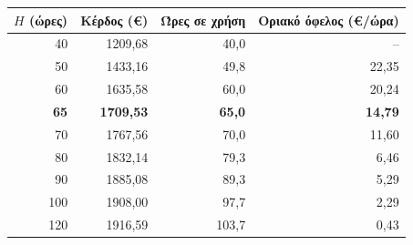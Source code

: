 \begin{tabular}{@{}rrrr@{}}
\toprule
$H$ (ώρες) & \textbf{Κέρδος (€)} & \textbf{Ώρες σε χρήση} & \textbf{Οριακό όφελος (€/ώρα)} \\
\midrule
40 & 1209,68 & 40,0 & -- \\
50 & 1433,16 & 49,8 & 22,35 \\
60 & 1635,58 & 60,0 & 20,24 \\
\bfseries 65 & \bfseries 1709,53 & \bfseries 65,0 & \bfseries 14,79 \\
70 & 1767,56 & 70,0 & 11,60 \\
80 & 1832,14 & 79,3 & 6,46 \\
90 & 1885,08 & 89,3 & 5,29 \\
100 & 1908,00 & 97,7 & 2,29 \\
120 & 1916,59 & 103,7 & 0,43 \\
\bottomrule
\end{tabular}
